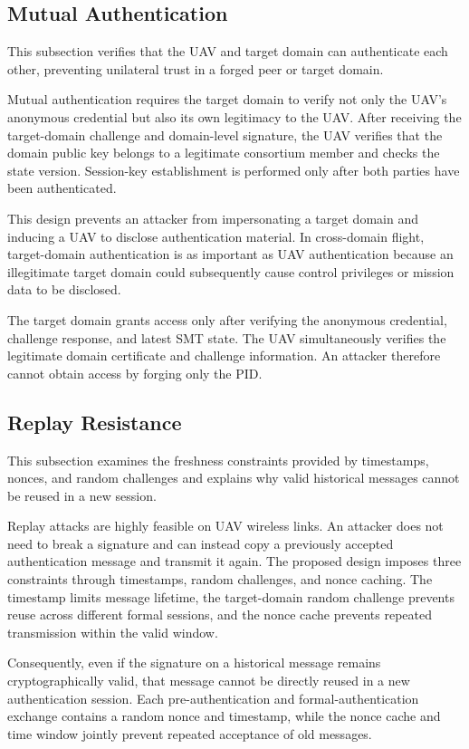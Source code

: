 \documentclass[lettersize,journal]{IEEEtran}
\begin{document}
	
	\subsection{Mutual Authentication}
	This subsection verifies that the UAV and target domain can authenticate each other, preventing unilateral trust in a forged peer or target domain.
	
	
	Mutual authentication requires the target domain to verify not only the UAV's anonymous credential but also its own legitimacy to the UAV. After receiving the target-domain challenge and domain-level signature, the UAV verifies that the domain public key belongs to a legitimate consortium member and checks the state version. Session-key establishment is performed only after both parties have been authenticated.
	
	This design prevents an attacker from impersonating a target domain and inducing a UAV to disclose authentication material. In cross-domain flight, target-domain authentication is as important as UAV authentication because an illegitimate target domain could subsequently cause control privileges or mission data to be disclosed.
	
	The target domain grants access only after verifying the anonymous credential, challenge response, and latest SMT state. The UAV simultaneously verifies the legitimate domain certificate and challenge information. An attacker therefore cannot obtain access by forging only the PID.
	
	\subsection{Replay Resistance}
	This subsection examines the freshness constraints provided by timestamps, nonces, and random challenges and explains why valid historical messages cannot be reused in a new session.
	
	
	Replay attacks are highly feasible on UAV wireless links. An attacker does not need to break a signature and can instead copy a previously accepted authentication message and transmit it again. The proposed design imposes three constraints through timestamps, random challenges, and nonce caching. The timestamp limits message lifetime, the target-domain random challenge prevents reuse across different formal sessions, and the nonce cache prevents repeated transmission within the valid window.
	
	Consequently, even if the signature on a historical message remains cryptographically valid, that message cannot be directly reused in a new authentication session. Each pre-authentication and formal-authentication exchange contains a random nonce and timestamp, while the nonce cache and time window jointly prevent repeated acceptance of old messages.
	
\end{document}
